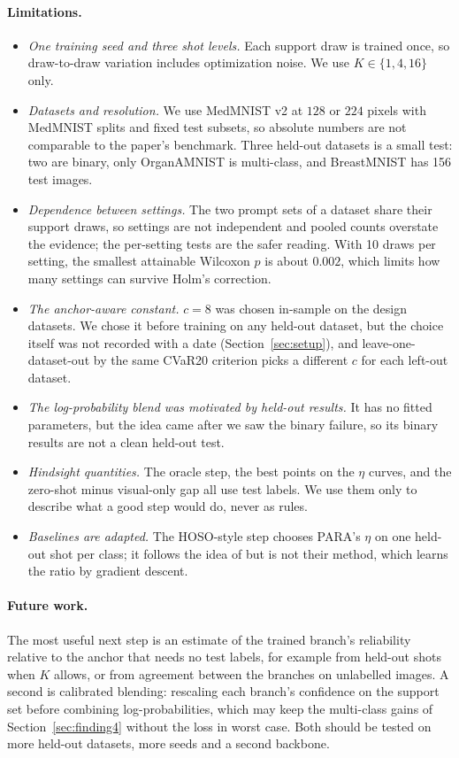 \paragraph{Limitations.}
\begin{itemize}
  \item \emph{One training seed and three shot levels.} Each support draw is trained once, so draw-to-draw variation includes optimization noise.
  We use $K \in \{1, 4, 16\}$ only.
  \item \emph{Datasets and resolution.} We use MedMNIST v2 at $128$ or $224$ pixels with MedMNIST splits and fixed test subsets,
  so absolute numbers are not comparable to the paper's benchmark.
  Three held-out datasets is a small test: two are binary, only OrganAMNIST is multi-class, and BreastMNIST has 156 test images.
  \item \emph{Dependence between settings.} The two prompt sets of a dataset share their support draws, so settings are not independent and pooled counts overstate the evidence;
  the per-setting tests are the safer reading.
  With 10 draws per setting, the smallest attainable Wilcoxon $p$ is about $0.002$, which limits how many settings can survive Holm's correction.
  \item \emph{The anchor-aware constant.} $c = 8$ was chosen in-sample on the design datasets.
  We chose it before training on any held-out dataset, but the choice itself was not recorded with a date (Section~\ref{sec:setup}),
  and leave-one-dataset-out by the same CVaR20 criterion picks a different $c$ for each left-out dataset.
  \item \emph{The log-probability blend was motivated by held-out results.} It has no fitted parameters, but the idea came after we saw the binary failure,
  so its binary results are not a clean held-out test.
  \item \emph{Hindsight quantities.} The oracle step, the best points on the $\eta$ curves, and the zero-shot minus visual-only gap all use test labels.
  We use them only to describe what a good step would do, never as rules.
  \item \emph{Baselines are adapted.} The HOSO-style step chooses PARA's $\eta$ on one held-out shot per class; it follows the idea of \citet{vorster2026hoso}
  but is not their method, which learns the ratio by gradient descent.
\end{itemize}

\paragraph{Future work.}
The most useful next step is an estimate of the trained branch's reliability relative to the anchor that needs no test labels,
for example from held-out shots when $K$ allows, or from agreement between the branches on unlabelled images.
A second is calibrated blending: rescaling each branch's confidence on the support set before combining log-probabilities,
which may keep the multi-class gains of Section~\ref{sec:finding4} without the loss in worst case.
Both should be tested on more held-out datasets, more seeds and a second backbone.

